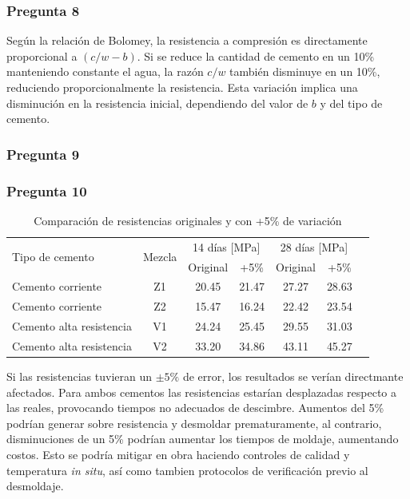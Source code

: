 \subsubsection*{Pregunta 8} 
Según la relación de Bolomey, la resistencia a compresión es directamente proporcional a \((c/w - b)\). Si se reduce la cantidad de cemento en un 10\% manteniendo constante el agua, la razón \( c/w \) también disminuye en un 10\%, reduciendo proporcionalmente la resistencia. Esta variación implica una disminución en la resistencia inicial, dependiendo del valor de \( b \) y del tipo de cemento.

\subsubsection*{Pregunta 9} 



\subsubsection*{Pregunta 10} 

\begin{table}[H]
\centering
\caption{Comparación de resistencias originales y con +5\% de variación}
\renewcommand{\arraystretch}{1.2}
\small
\begin{tabular}{lcccccc}
\hline
\multirow{2}{*}{Tipo de cemento} & \multirow{2}{*}{Mezcla} & \multicolumn{2}{c}{14 días [MPa]} & \multicolumn{2}{c}{28 días [MPa]} \\
\cline{3-6}
 & & Original & +5\% & Original & +5\% \\
\hline
Cemento corriente & Z1 & 20.45 & 21.47 & 27.27 & 28.63 \\
Cemento corriente & Z2 & 15.47 & 16.24 & 22.42 & 23.54 \\
\hline
Cemento alta resistencia & V1 & 24.24 & 25.45 & 29.55 & 31.03 \\
Cemento alta resistencia & V2 & 33.20 & 34.86 & 43.11 & 45.27 \\
\hline
\end{tabular}
\end{table}

Si las resistencias tuvieran un $\pm5\%$ de error, los resultados se verían directmante afectados. Para ambos cementos las resistencias estarían desplazadas respecto a las reales, provocando tiempos no adecuados de descimbre.
Aumentos del 5\% podrían generar sobre resistencia y desmoldar prematuramente, al contrario, disminuciones de un 5\% podrían aumentar los tiempos de moldaje, aumentando costos. Esto se podría mitigar en obra haciendo controles de calidad y temperatura \textit{in situ}, así como tambien protocolos de verificación previo al desmoldaje.

